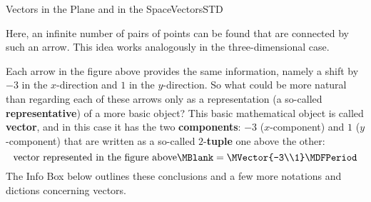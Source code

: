 \begin{MXContent}{Vectors in the Plane and in the Space}{Vectors}{STD}
\begin{center}
{
} 
\end{center}
Here, an infinite number of pairs of points can be found that are connected by such an arrow. 
This idea works analogously in the three-dimensional case.

Each arrow in the figure above provides the same information, namely a shift by $-3$ in 
the $x$-direction and $1$ in the $y$-direction. So what could be more natural than regarding each 
of these arrows only as a representation (a so-called \textbf{representative}) of a more basic object?
This basic mathematical object is called \textbf{vector}, and in this case it has the 
two \textbf{components}: $-3$ ($x$-component) and $1$ ($y$-component) that are written as a so-called 
$2$-\textbf{tuple} one above the other:
\[
 \textrm{vector represented in the figure above}\MBlank = \MVector{-3\\1}\MDFPeriod
\]
The Info Box below outlines these conclusions and a few more notations and dictions concerning vectors.


\end{MXContent}
